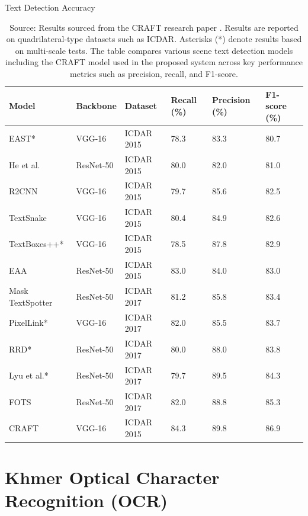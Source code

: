 \begin{table}[H]
  \centering
  \caption{Text Detection Accuracy}
  \begin{tabularx}{\linewidth}{|L{3.5cm}|L{2.5cm}|L{2.5cm}|C{2cm}|C{2cm}|C{2cm}|}
    \hline
    \textbf{Model} & \textbf{Backbone} & \textbf{Dataset} & \textbf{Recall (\%)} & \textbf{Precision (\%)} & \textbf{F1-score (\%)} \\
    \hline
    EAST* & VGG-16 & ICDAR 2015 & 78.3 & 83.3 & 80.7 \\
    He et al. & ResNet-50 & ICDAR 2015 & 80.0 & 82.0 & 81.0 \\
    R2CNN & VGG-16 & ICDAR 2015 & 79.7 & 85.6 & 82.5 \\
    TextSnake & VGG-16 & ICDAR 2015 & 80.4 & 84.9 & 82.6 \\
    TextBoxes++* & VGG-16 & ICDAR 2015 & 78.5 & 87.8 & 82.9 \\
    EAA & ResNet-50 & ICDAR 2015 & 83.0 & 84.0 & 83.0 \\
    Mask TextSpotter & ResNet-50 & ICDAR 2017 & 81.2 & 85.8 & 83.4 \\
    PixelLink* & VGG-16 & ICDAR 2017 & 82.0 & 85.5 & 83.7 \\
    RRD* & ResNet-50 & ICDAR 2017 & 80.0 & 88.0 & 83.8 \\
    Lyu et al.* & ResNet-50 & ICDAR 2017 & 79.7 & 89.5 & 84.3 \\
    FOTS & ResNet-50 & ICDAR 2017 & 82.0 & 88.8 & 85.3 \\
    CRAFT & VGG-16 & ICDAR 2015 & 84.3 & 89.8 & 86.9 \\
    \hline
  \end{tabularx}
  \caption*{Source: Results sourced from the CRAFT research paper \cite{Hiremath_text_detection}. 
  Results are reported on quadrilateral-type datasets such as ICDAR. 
  Asterisks (*) denote results based on multi-scale tests. 
  The table compares various scene text detection models including the CRAFT model used in the proposed system across key performance metrics such as precision, recall, and F1-score.}
  \label{tab:text_detection_accuracy}
\end{table}

\vspace{1em}



\section{Khmer Optical Character Recognition (OCR)}
\label{sec:khmer_OCR_literature}

